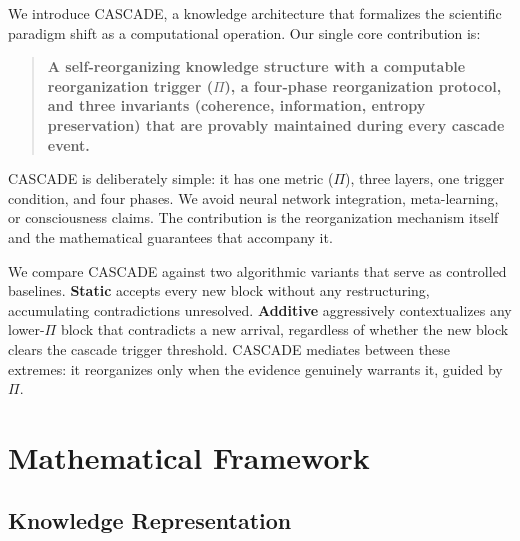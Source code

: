 \documentclass[11pt,a4paper]{article}
\theoremstyle{definition}
\newcommand{\tp}{\Pi}
\begin{document}
We introduce CASCADE, a knowledge architecture that formalizes the scientific paradigm
shift as a computational operation. Our single core contribution is:

\begin{quote}
\textbf{A self-reorganizing knowledge structure with a computable reorganization trigger
($\tp$), a four-phase reorganization protocol, and three invariants (coherence,
information, entropy preservation) that are provably maintained during every cascade
event.}
\end{quote}

CASCADE is deliberately simple: it has one metric ($\tp$), three layers, one trigger
condition, and four phases. We avoid neural network integration, meta-learning, or
consciousness claims. The contribution is the reorganization mechanism itself and the
mathematical guarantees that accompany it.

We compare CASCADE against two algorithmic variants that serve as controlled baselines.
\textbf{Static} accepts every new block without any restructuring, accumulating
contradictions unresolved. \textbf{Additive} aggressively contextualizes any lower-$\tp$
block that contradicts a new arrival, regardless of whether the new block clears the
cascade trigger threshold. CASCADE mediates between these extremes: it reorganizes only
when the evidence genuinely warrants it, guided by $\tp$.

\section{Mathematical Framework}\label{sec:framework}

\subsection{Knowledge Representation}
\end{document}
